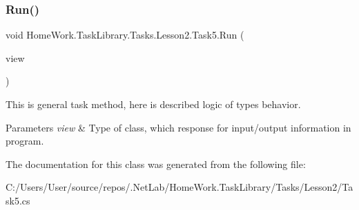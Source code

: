 \subsubsection{\texorpdfstring{Run()}{Run()}}
{\footnotesize\ttfamily void Home\+Work.\+Task\+Library.\+Tasks.\+Lesson2.\+Task5.\+Run (\begin{DoxyParamCaption}\item[{I\+Information}]{view }\end{DoxyParamCaption})}



This is general task method, here is described logic of types behavior. 


\begin{DoxyParams}{Parameters}
{\em view} & Type of class, which response for input/output information in program.\\
\hline
\end{DoxyParams}


The documentation for this class was generated from the following file\+:\begin{DoxyCompactItemize}
\item 
C\+:/\+Users/\+User/source/repos/.\+Net\+Lab/\+Home\+Work.\+Task\+Library/\+Tasks/\+Lesson2/Task5.\+cs\end{DoxyCompactItemize}
